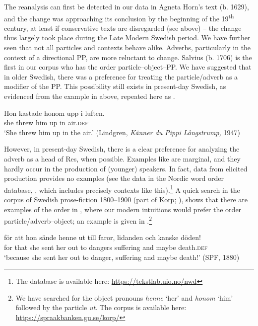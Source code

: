 \documentclass[output=paper]{langscibook}
\begin{document}
The reanalysis can first be detected in our data in Agneta Horn’s text (b. 1629), and the change was approaching its conclusion by the beginning of the 19\textsuperscript{th} century, at least if conservative texts are disregarded (see  above) – the change thus largely took place during the Late Modern Swedish period. We have further seen that not all particles and contexts behave alike. Adverbs, particularly in the context of a directional PP, are more reluctant to change. Salvius (b. 1706) is the first in our corpus who has the order particle–object–PP. We have suggested that in older Swedish, there was a preference for treating the particle/adverb as a modifier of the PP. This possibility still exists in present-day Swedish, as evidenced from the example in  above, repeated here as .


\ea\label{ex:lalu:64}
\gll  Hon    kastade   honom   upp     i   luften.\\
she       threw     him     up     in   air.\textsc{def}\\
\glt `She threw him up in the air.’ (Lindgren, \textit{Känner du Pippi Långstrump,} 1947)\\
\z


However, in present-day Swedish, there is a clear preference for analyzing the adverb as a head of Res, when possible. Examples like  are marginal, and they hardly occur in the production of (younger) speakers. In fact, data from elicited production provides no examples (see the data in the Nordic word order database, \citealt{LundquistEtAl2019}, which includes precisely contexts like this).\footnote{The database is available here: \url{https://tekstlab.uio.no/nwd}}  A quick search in the corpus of Swedish prose-fiction 1800–1900 (part of Korp; \citealt{BorinEtAl2012}), shows that there are examples of the order in , where our modern intuitions would prefer the order particle/adverb–object; an example is given in .\footnote{We have searched for the object pronouns \textit{henne} ‘her’ and \textit{honom} ‘him’ followed by the particle \textit{ut}. The corpus is available here: \url{https://spraakbanken.gu.se/korp/}}


\ea\label{ex:lalu:65}
\gll  för   att   hon   sände   henne   ut     till   faror, lidanden   och  kanske   döden!\\
for   that     she   sent     her   out     to   dangers suffering   and   maybe   death.\textsc{def}\\
\glt `because she sent her out to danger, suffering and maybe death!’ (SPF, 1880)\\
\z
\end{document}
